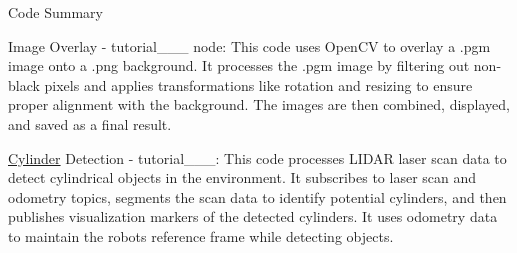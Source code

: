 Code Summary

Image Overlay -\/ tutorial\+\_\+\_\+\_ node\+: This code uses Open\+CV to overlay a .pgm image onto a .png background. It processes the .pgm image by filtering out non-\/black pixels and applies transformations like rotation and resizing to ensure proper alignment with the background. The images are then combined, displayed, and saved as a final result.

\mbox{\hyperlink{classCylinder}{Cylinder}} Detection -\/ tutorial\+\_\+\_\+\_\+: This code processes LIDAR laser scan data to detect cylindrical objects in the environment. It subscribes to laser scan and odometry topics, segments the scan data to identify potential cylinders, and then publishes visualization markers of the detected cylinders. It uses odometry data to maintain the robot\textquotesingle{}s reference frame while detecting objects. 